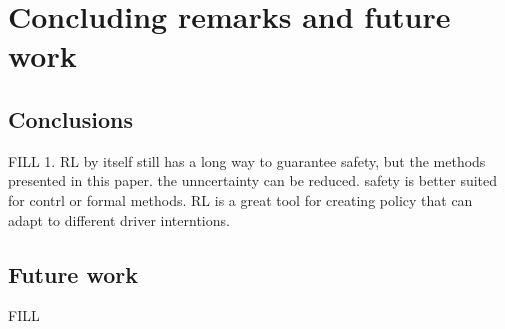 \chapter{Concluding remarks and future work}
\section{Conclusions}\label{sec:conclusion}
FILL
1. RL by itself still has a long way to guarantee safety, but the methods presented in this paper. the unncertainty can be reduced. safety is better suited for contrl or formal methods. RL is a great tool for creating policy that can adapt to different driver interntions. 
\section{Future work}
FILL